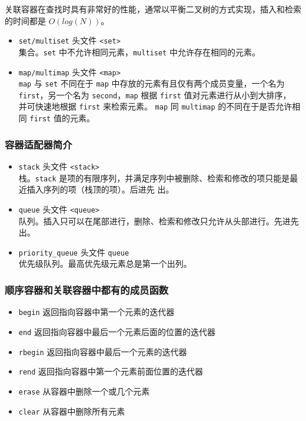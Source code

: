 \documentclass[UTF8]{ctexart}
\begin{document}
关联容器在查找时具有非常好的性能，通常以平衡二叉树的方式实现，插入和检索的时间都是 $O(log(N))$。

\begin{itemize}
    \item \texttt{set/multiset} 头文件 \texttt{<set>} \\
    集合。\texttt{set} 中不允许相同元素，\texttt{multiset} 中允许存在相同的元素。
    \item \texttt{map/multimap} 头文件 \texttt{<map>} \\
    \texttt{map} 与 \texttt{set} 不同在于 \texttt{map} 中存放的元素有且仅有两个成员变量，一个名为
    \texttt{first}，另一个名为 \texttt{second}，\texttt{map} 根据 \texttt{first} 值对元素进行从小到大排序，
    并可快速地根据 \texttt{first} 来检索元素。
    \texttt{map} 同 \texttt{multimap} 的不同在于是否允许相同 \texttt{first} 值的元素。
\end{itemize}

\subsubsection{容器适配器简介}
\begin{itemize}
    \item \texttt{stack} 头文件 \texttt{<stack>} \\
    栈。\texttt{stack} 是项的有限序列，并满足序列中被删除、检索和修改的项只能是最近插入序列的项（栈顶的项）。后进先
    出。
    \item \texttt{queue} 头文件 \texttt{<queue>} \\
    队列。插入只可以在尾部进行，删除、检索和修改只允许从头部进行。先进先出。
    \item \texttt{priority\_queue} 头文件 \texttt{queue} \\
    优先级队列。最高优先级元素总是第一个出列。
\end{itemize}

\subsubsection{顺序容器和关联容器中都有的成员函数}
\begin{itemize}
    \item \texttt{begin} 返回指向容器中第一个元素的迭代器
    \item \texttt{end} 返回指向容器中最后一个元素后面的位置的迭代器
    \item \texttt{rbegin} 返回指向容器中最后一个元素的迭代器
    \item \texttt{rend} 返回指向容器中第一个元素前面位置的迭代器
    \item \texttt{erase} 从容器中删除一个或几个元素
    \item \texttt{clear} 从容器中删除所有元素
\end{itemize}
\end{document}

